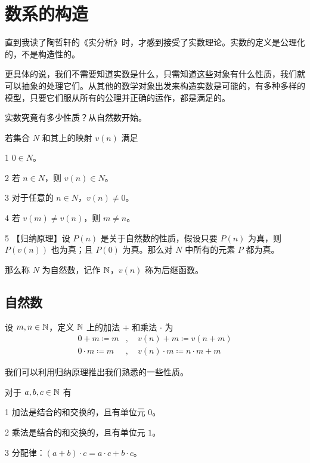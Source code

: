 \section{数系的构造}

直到我读了陶哲轩的《实分析》时，才感到接受了实数理论。实数的定义是公理化的，不是构造性的。

更具体的说，我们不需要知道实数是什么，只需知道这些对象有什么性质，我们就可以抽象的处理它们。从其他的数学对象出发来构造实数是可能的，有多种多样的模型，只要它们服从所有的公理并正确的运作，都是满足的。

实数究竟有多少性质？从自然数开始。

\begin{axiom}[Peano 公理]
	若集合 $N$ 和其上的映射 $v(n)$ 满足

	\num{1} $0\in N$。

	\num{2} 若 $n\in N$，则 $v(n) \in N$。

	\num{3} 对于任意的 $n\in N$，$v(n) \ne 0$。

	\num{4} 若 $v(m) \ne v(n)$，则 $m\ne n$。

	\num{5} 【归纳原理】设 $P(n)$ 是关于自然数的性质，假设只要 $P(n)$ 为真，则 $P(v(n))$ 也为真；且 $P(0)$ 为真。那么对 $N$ 中所有的元素 $P$ 都为真。

	那么称 $N$ 为自然数，记作 $\NN$，$v(n)$ 称为后继函数。
\end{axiom}

\subsection{自然数}

设 $m,n\in \mathbb{N}$，定义 $\NN$ 上的加法 $+$ 和乘法 $\cdot$ 为
\begin{equation*}
	\begin{aligned}
		0+m\coloneqq m&,\quad v(n)+m\coloneqq v(n+m)\\
		0\cdot m\coloneqq m&,\quad v(n)\cdot m\coloneqq n \cdot m + m
	\end{aligned}
\end{equation*}

我们可以利用归纳原理推出我们熟悉的一些性质。

\begin{theorem}[$\NN$ 的代数算律]
	对于 $a,b,c\in \mathbb{N}$ 有

	\num{1} 加法是结合的和交换的，且有单位元 $0$。

	\num{2} 乘法是结合的和交换的，且有单位元 $1$。

	\num{3} 分配律：$(a+b) \cdot  c = a \cdot c + b\cdot c$。
\end{theorem}


